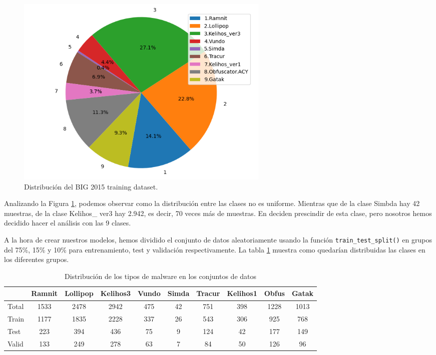 \begin{figure}[h]
    \begin{center}
    \includegraphics[width=0.6\textwidth]{img/circularMMC.png}
    \end{center}
    \caption{Distribución del BIG 2015 training dataset.}
    \label{img: circularMMC}
\end{figure}  

Analizando la Figura \ref{img: circularMMC}, podemos observar como la distribución entre las clases no es uniforme. Mientras que de la clase Simbda hay 42 muestras, de la clase Kelihos\_ ver3 hay 2.942, es decir, 70 veces más de muestras. En \citep{kebede2017classification} deciden prescindir de esta clase, pero nosotros hemos decidido hacer el análisis con las 9 clases. 


A la hora de crear nuestros modelos, hemos dividido el conjunto de datos aleatoriamente usando la función \texttt{train\_test\_split()} en grupos del 75\%, 15\% y 10\% para entrenamiento, test y validación respectivamente. La tabla \ref{tab:malware_distribution} muestra como quedarían distribuidas las clases en los diferentes grupos.

\begin{table}[h]
\centering
\begin{tabular}{lccccccccc}
\hline
& Ramnit & Lollipop & Kelihos3 & Vundo & Simda & Tracur & Kelihos1 & Obfus & Gatak \\
\hline
Total & 1533 & 2478 & 2942 & 475 & 42 & 751 & 398 & 1228 & 1013 \\
Train & 1177 & 1835 & 2228 & 337 & 26 & 543 & 306 & 925 & 768 \\
Test & 223 & 394 & 436 & 75 & 9 & 124 & 42 & 177 & 149 \\
Valid & 133 & 249 & 278 & 63 & 7 & 84 & 50 & 126 & 96 \\
\hline
\end{tabular}
\caption{Distribución de los tipos de malware en los conjuntos de datos}
\label{tab:malware_distribution}
\end{table}

